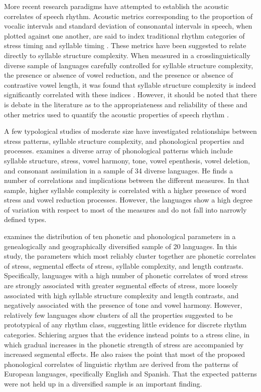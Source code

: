   More recent research paradigms have attempted to establish the acoustic correlates of speech rhythm. Acoustic metrics corresponding to the proportion of vocalic intervals and standard deviation of consonantal intervals in speech, when plotted against one another, are said to index traditional rhythm categories of stress timing and syllable timing \citep{RamusEtAl1999}. These metrics have been suggested to relate directly to syllable structure complexity. When measured in a crosslinguistically diverse sample of languages carefully controlled for syllable structure complexity, the presence or absence of vowel reduction, and the presence or absence of contrastive vowel length, it was found that syllable structure complexity is indeed significantly correlated with these indices \citep{EasterdayEtAl2011}. However, it should be noted that there is debate in the literature as to the appropriateness and reliability of these and other metrics used to quantify the acoustic properties of speech rhythm \citep{WigetEtAl2010}.



  A few typological studies of moderate size have investigated relationships between stress patterns, syllable structure complexity, and phonological properties and processes. \citet{Auer1993} examines a diverse array of phonological patterns which include syllable structure, stress, vowel harmony, tone, vowel epenthesis, vowel deletion, and consonant assimilation in a sample of 34 diverse languages. He finds a number of correlations and implications between the different measures. In that sample, higher syllable complexity is correlated with a higher presence of word stress and vowel reduction processes. However, the languages show a high degree of variation with respect to most of the measures and do not fall into narrowly defined types. 



  \citet{Schiering2007} examines the distribution of ten phonetic and phonological parameters in a genealogically and geographically diversified sample of 20 languages. In this study, the parameters which most reliably cluster together are phonetic correlates of stress, segmental effects of stress, syllable complexity, and length contrasts. Specifically, languages with a high number of phonetic correlates of word stress are strongly associated with greater segmental effects of stress, more loosely associated with high syllable structure complexity and length contrasts, and negatively associated with the presence of tone and vowel harmony. However, relatively few languages show clusters of all the properties suggested to be prototypical of any rhythm class, suggesting little evidence for discrete rhythm categories. Schiering argues that the evidence instead points to a stress cline, in which gradual increases in the phonetic strength of stress are accompanied by increased segmental effects. He also raises the point that most of the proposed phonological correlates of linguistic rhythm are derived from the patterns of European languages, specifically English and Spanish. That the expected patterns were not held up in a diversified sample is an important finding.



